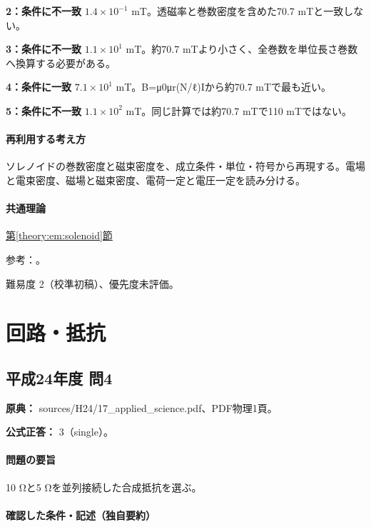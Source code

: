 \noindent\textbf{2：条件に不一致} \(1.4\times10^{-1}\) mT。透磁率と巻数密度を含めた70.7 mTと一致しない。\par

\noindent\textbf{3：条件に不一致} \(1.1\times10^1\) mT。約70.7 mTより小さく、全巻数を単位長さ巻数へ換算する必要がある。\par

\noindent\textbf{4：条件に一致} \(7.1\times10^1\) mT。B=μ0μr(N/ℓ)Iから約70.7 mTで最も近い。\par

\noindent\textbf{5：条件に不一致} \(1.1\times10^2\) mT。同じ計算では約70.7 mTで110 mTではない。\par

\paragraph{再利用する考え方} ソレノイドの巻数密度と磁束密度を、成立条件・単位・符号から再現する。電場と電束密度、磁場と磁束密度、電荷一定と電圧一定を読み分ける。

\paragraph{共通理論} \hyperref[theory:em:solenoid]{第\ref*{theory:em:solenoid}節}

\par 参考：\cite{mit_em09}。

\par 難易度 2（校準初稿）、優先度未評価。

\section{回路・抵抗}

\subsection{平成24年度 問4}
\label{q:h24-reg-applied-04}

\noindent\textbf{原典：} sources/H24/17\_applied\_science.pdf、PDF物理1頁。

\textbf{公式正答：} 3（single）。

\paragraph{問題の要旨} 10 Ωと5 Ωを並列接続した合成抵抗を選ぶ。

\paragraph{確認した条件・記述（独自要約）}\mbox{}\par

